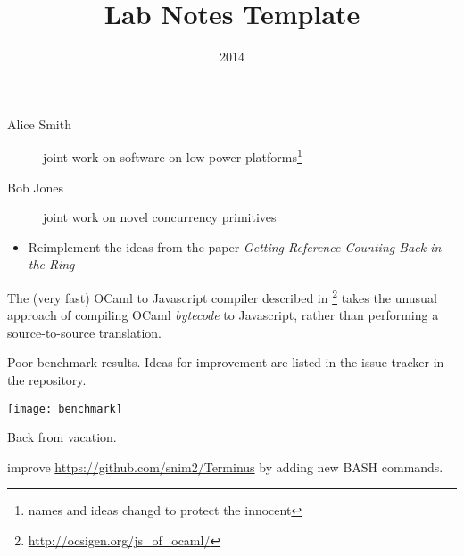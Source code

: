 \documentclass[a4paper]{tufte-handout}
\title{Lab Notes Template}
\date{2014}
\begin{document}
\maketitle


\begin{projects}
	\begin{description}
		\item [Alice Smith] joint work on software on low power platforms\footnote{names and ideas changd to protect the innocent}
		\item [Bob Jones] joint work on novel concurrency primitives
	\end{description}
\end{projects}


\begin{maybe}
    \begin{itemize}
    	\item Reimplement the ideas from the paper \textit{Getting Reference Counting Back in the Ring} \citep{Shahriyar+12}
    \end{itemize}
\end{maybe}



The (very fast) OCaml to Javascript compiler described in \citep{VouillonBalat13}\footnote{\url{http://ocsigen.org/js_of_ocaml/}} takes the unusual approach of compiling OCaml \textit{bytecode} to Javascript, rather than performing a source-to-source translation.  

\hrulefill



Poor benchmark results. Ideas for improvement are listed in the issue tracker in the repository.

\texttt{[image: benchmark]}

\hrulefill



Back from vacation.

 improve \url{https://github.com/snim2/Terminus} by adding new BASH commands.
\end{document}
